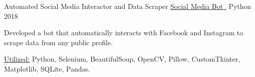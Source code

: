 \begin{cventries}
      \cventryprojects
      {Automated Social Media Interactor and Data Scraper} %
      {\href{https://www.hamidurrk.com/projects?project=social-media-scraper}{Social Media Bot\ {\mdseries\faExternalLink}}} %
      {Python} %
      {2018} %
      {
        \begin{cvitems} %
          \item { Developed a bot that automatically interacts with Facebook and Instagram to scrape data from any public profile.}
          \item {\underline{Utilized:} Python, Selenium, BeautifulSoup, OpenCV, Pillow, CustomTkinter, Matplotlib, SQLite, Pandas.}
        \end{cvitems}
        }
        

\end{cventries}

